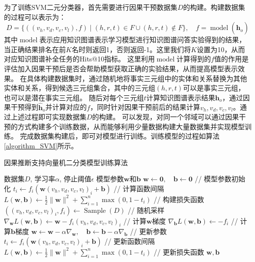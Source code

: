 \documentclass[algorithmlist, AutoFakeBold, AutoFakeSlant, figurelist, tablelist, nomlist, engineering]{seuthesix}
\begin{document}
为了训练SVM二元分类器，首先需要进行因果干预数据集$D$的构建。构建数据集的过程可以表示为：
\begin{equation}
  D = \{((v_h, v_d, v_c, v_l), f) \mid (h, r, t) \in F \cup (h, r, t) \notin F\},\quad f = \operatorname{model}(\bm{\hat{h}}_o)
\end{equation}
其中$\operatorname{model}$表示应用知识图谱表示学习模型进行知识图谱问答实验得到的结果，当正确结果排名在前$K$名时则返回1，否则返回-1。这里我们将$K$设置为10，从而对应知识图谱补全任务的Hits@10指标。
这里利用$\operatorname{model}$计算得到的$f$值的作用是评估加入因果干预后是否会帮助模型获取正确的实验结果，从而提高模型表示效果。
在具体构建数据集时，通过随机地将事实三元组中的实体和关系替换为其他实体和关系，得到候选三元组集合，其中的三元组$(h, r, t)$可以是事实三元组，也可以是潜在事实三元组。
随后对每个三元组$t$计算知识图谱表示结果$\bm{h}_o$，通过因果干预得到$\bm{\hat{h}}_o$并计算对应的$f$，同时针对因果干预前后的结果计算$v_h, v_d, v_c, v_l$。通过上述过程即可实现数据集$D$的构建。
可以发现，对同一个邻域可以通过因果干预的方式构建多个训练数据，从而能够利用少量数据构建大量数据集并实现模型训练。
完成数据集构建后，即可对模型进行训练。训练模型的过程如算法\ref{algorithm_SVM}所示。
\begin{algorithm}[tb]
	\caption{因果推断支持向量机二分类模型训练算法}
	\label{algorithm_SVM}
	\begin{algorithmic}[1]
    \Require 数据集$D$, 学习率$\alpha$, 停止阈值$\epsilon$
    \Ensure 模型参数$\bm{w}$和$\bm{b}$
    \State $\bm{w} \leftarrow \bm{0},\quad \bm{b} \leftarrow \bm{0}$ // 模型参数初始化
    \State $t_i \leftarrow f_i (\bm{w} (v_h, v_d, v_c, v_l)_i + \bm{b})$ // 计算函数间隔
    \State $L(\bm{w}, \bm{b}) \leftarrow \frac{1}{2} \|\bm{w}\|^2 + \sum_{i=1}^{n} \max(0, 1 - t_i)$ // 构建损失函数
    \EndFor
    \Repeat
    \State $((v_h, v_d, v_c, v_l)_i, f_i) \leftarrow \operatorname{Sample}(D)$ // 随机采样
    \State $\nabla_{\bm{w}} L(\bm{w}, \bm{b}) \leftarrow \bm{w} - f_i (v_h, v_d, v_c, v_l)_i$ // 计算$\bm{w}$梯度
    \State $\nabla_{\bm{b}} L(\bm{w}, \bm{b}) \leftarrow - f_i$ // 计算$\bm{b}$梯度
    \State $\bm{w} \leftarrow \bm{w} - \alpha \nabla_{\bm{w}},\quad \bm{b} \leftarrow \bm{b} - \alpha \nabla_{\bm{b}}$ // 更新参数
    \State $t_i \leftarrow f_i (\bm{w} (v_h, v_d, v_c, v_l)_i + \bm{b})$ // 更新函数间隔
    \State $L(\bm{w}, \bm{b}) \leftarrow \frac{1}{2} \|\bm{w}\|^2 + \sum_{i=1}^{n} \max(0, 1 - t_i)$ // 更新损失函数
    \EndIf
    \State \Return $\bm{w}, \bm{b}$
	\end{algorithmic}
\end{algorithm} 
\end{document}
